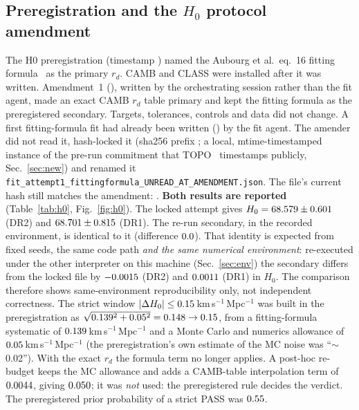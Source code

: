 \documentclass[11pt]{article}
\newcommand{\kms}{km\,s$^{-1}$\,Mpc$^{-1}$}
\begin{document}
\subsection{Preregistration and the $H_0$ protocol amendment}\label{sec:h0prot}
The H0 preregistration (timestamp \hzPreTime) named the Aubourg et al.\ eq.~16 fitting formula~\cite{aubourg2015} as the primary $r_d$.
CAMB and CLASS were installed after it was written. Amendment~1 (\hzAmdTime), written by the orchestrating session rather than the fit agent,
made an exact CAMB $r_d$ table primary and kept the fitting formula as the preregistered secondary. Targets, tolerances, controls and data
did not change. A first fitting-formula fit had already been written (\hzLockWritten) by the fit agent. The amender did not read it,
hash-locked it (sha256 prefix \texttt{\hzLockShaShort}; a local, mtime-timestamped instance of the pre-run commitment that TOPO~\cite{topo2024} timestamps publicly, Sec.~\ref{sec:new}) and renamed it
\texttt{fit\_attempt1\_fittingformula\_UNREAD\_AT\_AMENDMENT.json}. The file's current hash still matches the amendment: \hzLockShaNowMatches.
\textbf{Both results are reported} (Table~\ref{tab:h0}, Fig.~\ref{fig:h0}). The locked attempt gives $H_0=68.579\pm0.601$
(DR2) and $68.701\pm0.815$ (DR1). The re-run secondary, in the recorded environment, is identical to it (difference $0.0$). That identity is
expected from fixed seeds, the same code path \emph{and the same numerical environment}: re-executed under the other interpreter on this machine
(Sec.~\ref{sec:env}) the secondary differs from the locked file by $-0.0015$ (DR2) and $0.0011$ (DR1) in $H_0$. The comparison therefore shows
same-environment reproducibility only, not independent correctness. The strict window
$|\Delta H_0|\le0.15$\,\kms{} was built in the preregistration as $\sqrt{0.139^2+0.05^2}=0.148\to0.15$, from a fitting-formula systematic of
$0.139$\,\kms{} and a Monte Carlo and numerics allowance of $0.05$\,\kms{} (the preregistration's own estimate of the MC noise was ``$\sim$0.02''). With the
exact $r_d$ the formula term no longer applies. A post-hoc re-budget keeps the MC allowance and adds a CAMB-table interpolation term of $0.0044$, giving
$0.050$; it was \emph{not} used: the preregistered rule decides the verdict. The preregistered prior probability of a strict PASS was $0.55$.
\end{document}
